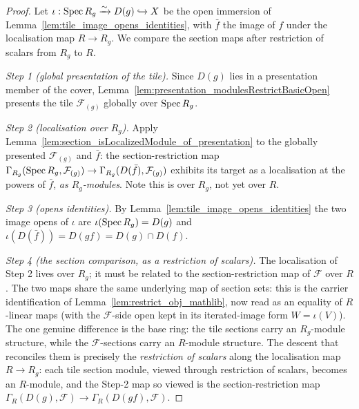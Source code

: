 \begin{proof}
  Let \(\iota : \operatorname{Spec} R_g \xrightarrow{\sim} D(g) \hookrightarrow X\) be the open immersion of
  Lemma~\ref{lem:tile_image_opens_identities}, with \(\bar f\) the image of \(f\) under the
  localisation map \(R \to R_g\). We compare the section maps after restriction of
  scalars from \(R_g\) to \(R\).

  \emph{Step 1 (global presentation of the tile).} Since \(D(g)\) lies in a presentation member of the
  cover, Lemma~\ref{lem:presentation_modulesRestrictBasicOpen} presents the tile
  \(\mathcal{F}_{(g)}\) globally over \(\operatorname{Spec} R_g\).

  \emph{Step 2 (localisation over \(R_g\)).} Apply
  Lemma~\ref{lem:section_isLocalizedModule_of_presentation} to the globally presented
  \(\mathcal{F}_{(g)}\) and \(\bar f\): the section-restriction map
  \(\Gamma_{R_g}(\operatorname{Spec} R_g, \mathcal{F}_{(g)}) \to \Gamma_{R_g}(D(\bar f), \mathcal{F}_{(g)})\)
  exhibits its target as a localisation at the powers of \(\bar f\), \emph{as \(R_g\)-modules}. Note this
  is over \(R_g\), not yet over \(R\).

  \emph{Step 3 (opens identities).} By Lemma~\ref{lem:tile_image_opens_identities} the two image opens of
  \(\iota\) are \(\iota(\operatorname{Spec} R_g) = D(g)\) and \(\iota(D(\bar f)) = D(gf) = D(g) \cap D(f)\).

  \emph{Step 4 (the section comparison, as a restriction of scalars).} The localisation of Step 2 lives
  over \(R_g\); it must be related to the section-restriction map of \(\mathcal{F}\) over \(R\). The two
  maps share the same underlying map of section sets: this is the carrier identification of
  Lemma~\ref{lem:restrict_obj_mathlib}, now read as an equality of \(R\)-linear maps (with the
  \(\mathcal{F}\)-side open kept in its iterated-image form \(W = \iota(V)\)). The one genuine difference
  is the base ring: the tile sections carry an \(R_g\)-module structure, while the
  \(\mathcal{F}\)-sections carry an \(R\)-module structure. The descent that reconciles them is precisely
  the \emph{restriction of scalars} along the localisation map \(R \to R_g\): each tile section module,
  viewed through restriction of scalars, becomes an \(R\)-module, and the Step-2 map so viewed is the
  section-restriction map \(\Gamma_R(D(g), \mathcal{F}) \to \Gamma_R(D(gf), \mathcal{F})\).


\end{proof}
